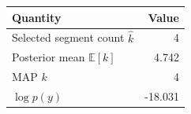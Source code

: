\begin{tabular}{lr}\toprule
Quantity & Value\\\midrule
Selected segment count $\widehat{k}$ & 4\\
Posterior mean $\mathbb{E}[k]$ & 4.742\\
MAP $k$ & 4\\
$\log p(y)$ & -18.031\\
\bottomrule\end{tabular}
